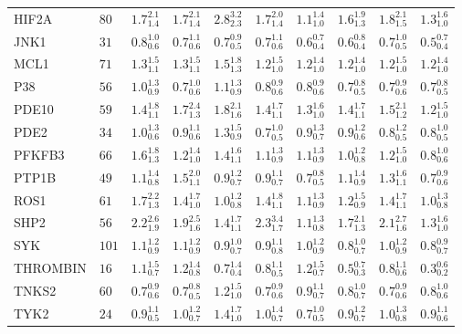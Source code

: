 \begin{tabular}{llllllllll}
HIF2A       &    $80$ &  $1.7_{1.4}^{2.1}$ &  $1.7_{1.4}^{2.1}$ &  $2.8_{2.3}^{3.2}$ &  $1.7_{1.4}^{2.0}$ &  $1.1_{1.0}^{1.4}$ &  $1.6_{1.3}^{1.9}$ &     $1.8_{1.5}^{2.1}$ &  $1.3_{1.0}^{1.6}$ \\
JNK1        &    $31$ &  $0.8_{0.6}^{1.0}$ &  $0.7_{0.6}^{1.1}$ &  $0.7_{0.5}^{0.9}$ &  $0.7_{0.6}^{1.1}$ &  $0.6_{0.4}^{0.7}$ &  $0.6_{0.4}^{0.8}$ &     $0.7_{0.5}^{1.0}$ &  $0.5_{0.4}^{0.7}$ \\
MCL1        &    $71$ &  $1.3_{1.1}^{1.5}$ &  $1.3_{1.1}^{1.5}$ &  $1.5_{1.3}^{1.8}$ &  $1.2_{1.0}^{1.5}$ &  $1.2_{1.0}^{1.4}$ &  $1.2_{1.0}^{1.4}$ &     $1.2_{1.0}^{1.5}$ &  $1.2_{1.0}^{1.4}$ \\
P38         &    $56$ &  $1.0_{0.9}^{1.3}$ &  $0.7_{0.6}^{1.0}$ &  $1.1_{0.9}^{1.3}$ &  $0.8_{0.6}^{0.9}$ &  $0.8_{0.6}^{0.9}$ &  $0.7_{0.5}^{0.8}$ &     $0.7_{0.6}^{0.9}$ &  $0.7_{0.5}^{0.8}$ \\
PDE10       &    $59$ &  $1.4_{1.1}^{1.8}$ &  $1.7_{1.3}^{2.4}$ &  $1.8_{1.6}^{2.1}$ &  $1.4_{1.1}^{1.7}$ &  $1.3_{1.0}^{1.6}$ &  $1.4_{1.1}^{1.7}$ &     $1.5_{1.2}^{2.1}$ &  $1.2_{1.0}^{1.5}$ \\
PDE2        &    $34$ &  $1.0_{0.6}^{1.3}$ &  $0.9_{0.6}^{1.1}$ &  $1.3_{0.9}^{1.5}$ &  $0.7_{0.5}^{1.0}$ &  $0.9_{0.7}^{1.3}$ &  $0.9_{0.6}^{1.2}$ &     $0.8_{0.5}^{1.2}$ &  $0.8_{0.5}^{1.0}$ \\
PFKFB3      &    $66$ &  $1.6_{1.3}^{1.8}$ &  $1.2_{1.0}^{1.4}$ &  $1.4_{1.1}^{1.6}$ &  $1.1_{0.9}^{1.3}$ &  $1.1_{0.9}^{1.3}$ &  $1.0_{0.8}^{1.2}$ &     $1.2_{1.0}^{1.5}$ &  $0.8_{0.6}^{1.0}$ \\
PTP1B       &    $49$ &  $1.1_{0.8}^{1.4}$ &  $1.5_{1.1}^{2.0}$ &  $0.9_{0.7}^{1.2}$ &  $0.9_{0.7}^{1.1}$ &  $0.7_{0.5}^{0.8}$ &  $1.1_{0.9}^{1.4}$ &     $1.3_{1.1}^{1.6}$ &  $0.7_{0.6}^{0.9}$ \\
ROS1        &    $61$ &  $1.7_{1.3}^{2.2}$ &  $1.4_{1.0}^{1.7}$ &  $1.0_{0.8}^{1.2}$ &  $1.4_{1.1}^{1.8}$ &  $1.1_{0.9}^{1.3}$ &  $1.2_{0.9}^{1.5}$ &     $1.4_{1.1}^{1.7}$ &  $1.0_{0.8}^{1.3}$ \\
SHP2        &    $56$ &  $2.2_{1.9}^{2.6}$ &  $1.9_{1.6}^{2.5}$ &  $1.4_{1.1}^{1.7}$ &  $2.3_{1.7}^{3.4}$ &  $1.1_{0.8}^{1.3}$ &  $1.7_{1.3}^{2.1}$ &     $2.1_{1.6}^{2.7}$ &  $1.3_{1.0}^{1.6}$ \\
SYK         &   $101$ &  $1.1_{0.9}^{1.2}$ &  $1.1_{0.9}^{1.2}$ &  $0.9_{0.7}^{1.0}$ &  $0.9_{0.8}^{1.1}$ &  $1.0_{0.9}^{1.2}$ &  $0.8_{0.7}^{1.0}$ &     $1.0_{0.9}^{1.2}$ &  $0.8_{0.7}^{0.9}$ \\
THROMBIN    &    $16$ &  $1.1_{0.7}^{1.5}$ &  $1.2_{0.8}^{1.4}$ &  $0.7_{0.4}^{1.4}$ &  $0.8_{0.5}^{1.1}$ &  $1.2_{0.7}^{1.5}$ &  $0.5_{0.3}^{0.7}$ &     $0.8_{0.6}^{1.1}$ &  $0.3_{0.2}^{0.6}$ \\
TNKS2       &    $60$ &  $0.7_{0.6}^{0.9}$ &  $0.7_{0.5}^{0.8}$ &  $1.2_{1.0}^{1.5}$ &  $0.7_{0.6}^{0.9}$ &  $0.9_{0.7}^{1.1}$ &  $0.8_{0.7}^{1.0}$ &     $0.7_{0.6}^{0.9}$ &  $0.8_{0.6}^{1.0}$ \\
TYK2        &    $24$ &  $0.9_{0.5}^{1.1}$ &  $1.0_{0.7}^{1.2}$ &  $1.4_{1.0}^{1.7}$ &  $1.0_{0.7}^{1.4}$ &  $0.7_{0.5}^{1.0}$ &  $0.9_{0.7}^{1.2}$ &     $1.0_{0.8}^{1.3}$ &  $0.9_{0.6}^{1.1}$ \\
\bottomrule
\end{tabular}

